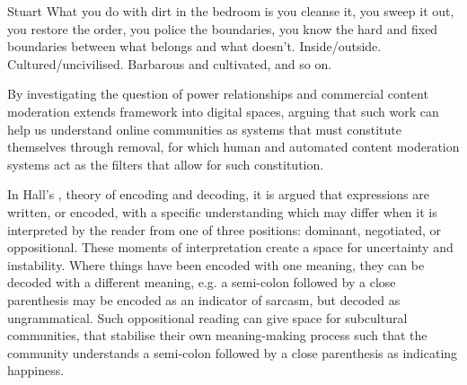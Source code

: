 \begin{citequote}{Stuart \citet[p.3]{Hall:1997}}
  What you do with dirt in the bedroom is you cleanse it, you sweep it out, you restore the order, you police the boundaries, you know the hard and fixed boundaries between what belongs and what doesn't. Inside/outside. Cultured/uncivilised. Barbarous and cultivated, and so on.
\end{citequote}

By investigating the question of power relationships and commercial content moderation \citet{Lepawsky:2019} extends \citet{Douglas:1966} framework into digital spaces, arguing that such work can help us understand online communities as systems that must constitute themselves through removal, for which human and automated content moderation systems act as the filters that allow for such constitution.

In Hall's \citeyearpar{Hall:1997}, theory of encoding and decoding, it is argued that expressions are written, or encoded, with a specific understanding which may differ when it is interpreted by the reader from one of three positions: dominant, negotiated, or oppositional.
These moments of interpretation create a space for uncertainty and instability.
Where things have been encoded with one meaning, they can be decoded with a different meaning, e.g.
a semi-colon followed by a close parenthesis may be encoded as an indicator of sarcasm, but decoded as ungrammatical.
Such oppositional reading can give space for subcultural communities, that stabilise their own meaning-making process such that the community understands a semi-colon followed by a close parenthesis as indicating happiness.

